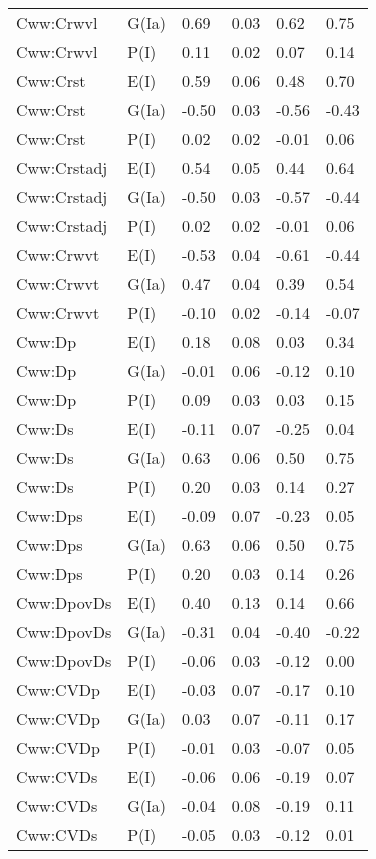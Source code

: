 \begin{center}
\begin{longtable}{|p{1.1in}|p{0.7in}|p{0.7in}|p{0.6in}|p{0.6in}|p{0.6in}|}
  Cww:Crwvl & G(Ia) & 0.69 & 0.03 & 0.62 & 0.75 \\ 
  Cww:Crwvl & P(I) & 0.11 & 0.02 & 0.07 & 0.14 \\ 
  Cww:Crst & E(I) & 0.59 & 0.06 & 0.48 & 0.70 \\ 
  Cww:Crst & G(Ia) & -0.50 & 0.03 & -0.56 & -0.43 \\ 
  Cww:Crst & P(I) & 0.02 & 0.02 & -0.01 & 0.06 \\ 
  Cww:Crstadj & E(I) & 0.54 & 0.05 & 0.44 & 0.64 \\ 
  Cww:Crstadj & G(Ia) & -0.50 & 0.03 & -0.57 & -0.44 \\ 
  Cww:Crstadj & P(I) & 0.02 & 0.02 & -0.01 & 0.06 \\ 
  Cww:Crwvt & E(I) & -0.53 & 0.04 & -0.61 & -0.44 \\ 
  Cww:Crwvt & G(Ia) & 0.47 & 0.04 & 0.39 & 0.54 \\ 
  Cww:Crwvt & P(I) & -0.10 & 0.02 & -0.14 & -0.07 \\ 
  Cww:Dp & E(I) & 0.18 & 0.08 & 0.03 & 0.34 \\ 
  Cww:Dp & G(Ia) & -0.01 & 0.06 & -0.12 & 0.10 \\ 
  Cww:Dp & P(I) & 0.09 & 0.03 & 0.03 & 0.15 \\ 
  Cww:Ds & E(I) & -0.11 & 0.07 & -0.25 & 0.04 \\ 
  Cww:Ds & G(Ia) & 0.63 & 0.06 & 0.50 & 0.75 \\ 
  Cww:Ds & P(I) & 0.20 & 0.03 & 0.14 & 0.27 \\ 
  Cww:Dps & E(I) & -0.09 & 0.07 & -0.23 & 0.05 \\ 
  Cww:Dps & G(Ia) & 0.63 & 0.06 & 0.50 & 0.75 \\ 
  Cww:Dps & P(I) & 0.20 & 0.03 & 0.14 & 0.26 \\ 
  Cww:DpovDs & E(I) & 0.40 & 0.13 & 0.14 & 0.66 \\ 
  Cww:DpovDs & G(Ia) & -0.31 & 0.04 & -0.40 & -0.22 \\ 
  Cww:DpovDs & P(I) & -0.06 & 0.03 & -0.12 & 0.00 \\ 
  Cww:CVDp & E(I) & -0.03 & 0.07 & -0.17 & 0.10 \\ 
  Cww:CVDp & G(Ia) & 0.03 & 0.07 & -0.11 & 0.17 \\ 
  Cww:CVDp & P(I) & -0.01 & 0.03 & -0.07 & 0.05 \\ 
  Cww:CVDs & E(I) & -0.06 & 0.06 & -0.19 & 0.07 \\ 
  Cww:CVDs & G(Ia) & -0.04 & 0.08 & -0.19 & 0.11 \\ 
  Cww:CVDs & P(I) & -0.05 & 0.03 & -0.12 & 0.01 \\ 

\end{longtable}
\end{center}
